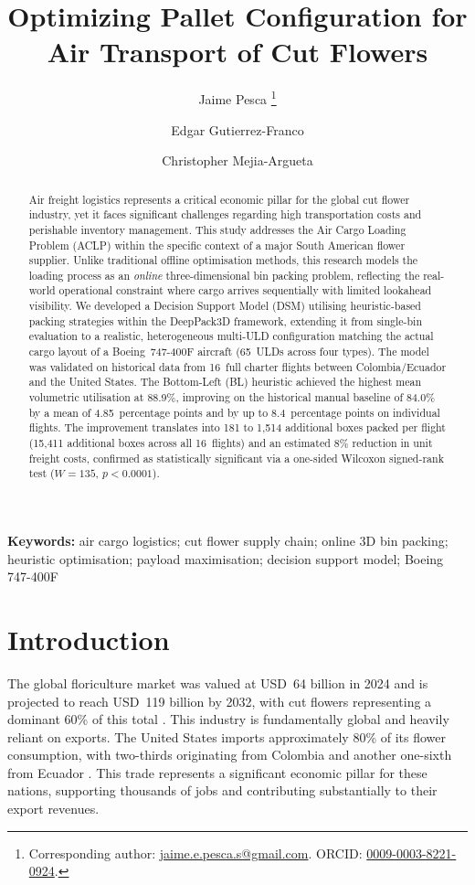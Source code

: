 \documentclass[12pt,a4paper]{article}
\title{\textbf{Optimizing Pallet Configuration for Air Transport of Cut Flowers}}
\author[1]{Jaime Pesca%
  \thanks{Corresponding author: \href{mailto:jaime.e.pesca.s@gmail.com}{jaime.e.pesca.s@gmail.com}.
  ORCID: \href{https://orcid.org/0009-0003-8221-0924}{0009-0003-8221-0924}.}}
\author[2]{Edgar Gutierrez-Franco}
\author[2]{Christopher Mejia-Argueta}
\affil[1]{Faculty of Engineering, Universidad de La Sabana,
  Km.~7 Autopista Norte de Bogot\'{a}, Ch\'{i}a, Colombia}
\affil[2]{Center for Transportation and Logistics,
  Massachusetts Institute of Technology, Cambridge, MA~02142, USA}
\date{}
\begin{document}
\maketitle

\begin{abstract}
Air freight logistics represents a critical economic pillar for the
global cut flower industry, yet it faces significant challenges regarding
high transportation costs and perishable inventory management.
This study addresses the Air Cargo Loading Problem (ACLP) within the
specific context of a major South American flower supplier.
Unlike traditional offline optimisation methods, this research models
the loading process as an \emph{online} three-dimensional bin packing
problem, reflecting the real-world operational constraint where cargo
arrives sequentially with limited lookahead visibility.
We developed a Decision Support Model (DSM) utilising heuristic-based
packing strategies within the DeepPack3D framework, extending it from
single-bin evaluation to a realistic, heterogeneous multi-ULD
configuration matching the actual cargo layout of a Boeing~747-400F
aircraft (65~ULDs across four types).
The model was validated on historical data from 16~full charter flights
between Colombia/Ecuador and the United States.
The Bottom-Left (BL) heuristic achieved the highest mean volumetric
utilisation at 88.9\%, improving on the historical manual baseline of
84.0\% by a mean of 4.85~percentage points and by up to 8.4~percentage
points on individual flights.
The improvement translates into 181 to 1{,}514 additional boxes packed
per flight (15{,}411 additional boxes across all 16~flights) and an
estimated 8\% reduction in unit freight costs, confirmed as
statistically significant via a one-sided Wilcoxon signed-rank test
($W=135$, $p<0.0001$).
\end{abstract}

\noindent\textbf{Keywords:} air cargo logistics; cut flower supply
chain; online 3D bin packing; heuristic optimisation; payload
maximisation; decision support model; Boeing 747-400F

\bigskip


\section{Introduction}
\label{sec:intro}

The global floriculture market was valued at USD~64 billion in 2024 and
is projected to reach USD~119 billion by 2032, with cut flowers
representing a dominant 60\% of this total \citep{FloricultureMarket2025}.
This industry is fundamentally global and heavily reliant on exports.
The United States imports approximately 80\% of its flower consumption,
with two-thirds originating from Colombia and another one-sixth from
Ecuador \citep{Darras2021}.
This trade represents a significant economic pillar for these nations,
supporting thousands of jobs and contributing substantially to their
export revenues.
\end{document}
